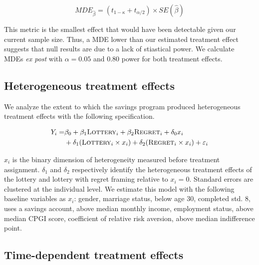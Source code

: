\documentclass[11pt]{article}
\begin{document}
		\begin{equation}
			MDE_{\hat \beta} = (t_{1-\kappa} + t_{\alpha/2}) \times SE(\hat \beta)
		\label{eq:mde} \end{equation}

		This metric is the smallest effect that would have been detectable given our current sample size. Thus, a MDE lower than our estimated treatment effect suggests that null results are due to a lack of stiastical power. We calculate MDEs \textit{ex post} with $\alpha = 0.05$ and 0.80 power for both treatment effects.


	\subsection{Heterogeneous treatment effects}

		We analyze the extent to which the savings program produced heterogeneous treatment effects with the following specification.

		\begin{equation} \begin{split}
		Y_{i} = & \beta_{0} + \beta_{1}\text{\textsc{Lottery}}_{i} + \beta_{2}\text{\textsc{Regret}}_{i} + \delta_{0}x_{i} \\
					& + \delta_{1}(\text{\textsc{Lottery}}_{i} \times x_{i}) + \delta_{2}(\text{\textsc{Regret}}_{i} \times x_{i}) + \varepsilon_{i}
		\end{split} \label{eq:heteffect} \end{equation}

		$x_{i}$ is the binary dimension of heterogeneity measured before treatment assignment. $\delta_{1}$ and $\delta_{2}$ respectively identify the heterogeneous treatment effects of the lottery and lottery with regret framing relative to $x_{i} = 0$. Standard errors are clustered at the individual level. We estimate this model with the following baseline variables as $x_{i}$: gender, marriage status, below age 30, completed std. 8, uses a savings account, above median monthly income, employment status, above median CPGI score, coefficient of relative risk aversion, above median indifference point.

	\subsection{Time-dependent treatment effects}
\end{document}
